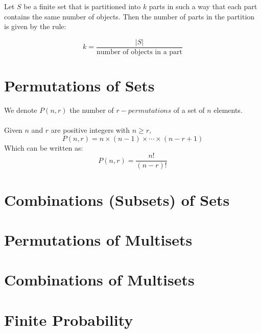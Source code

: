 \documentclass[12pt]{article}
\begin{document}
Let $S$ be a finite set that is partitioned into $k$ parts in such a way that each part contains the same number of objects. Then the number of parts in the partition is given by the rule:

$$
k = \frac{|S|}{\text{number of objects in a part}}
$$

\section{Permutations of Sets}

We denote $P(n, r)$ the number of $r-permutations$ of a set of $n$ elements.
\\\\
Given $n$ and $r$ are positive integers with $n \geq r$,
%
$$
P(n, r) = n \times (n - 1) \times \cdots \times (n - r + 1)
$$
%
Which can be written as:
%
$$
P(n, r) = \frac{n!}{(n - r)!}
$$

\section{Combinations (Subsets) of Sets}

\section{Permutations of Multisets}

\section{Combinations of Multisets}

\section{Finite Probability}
\end{document}
